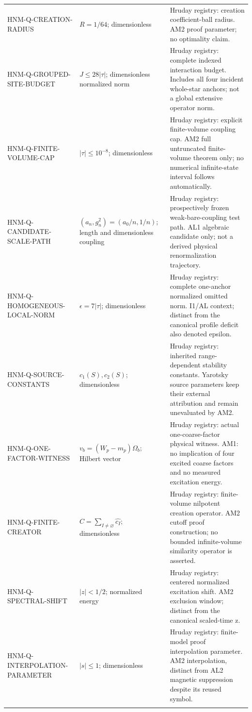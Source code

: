 \begin{longtable}{@{}p{37mm}p{40mm}p{72mm}@{}}
HNM-Q-CREATION-RADIUS & $R=1/64$; dimensionless & Hruday registry: creation coefficient-ball radius. AM2 proof parameter; no optimality claim.\\\addlinespace
HNM-Q-GROUPED-SITE-BUDGET & $J\le28|\tau|$; dimensionless normalized norm & Hruday registry: complete indexed interaction budget. Includes all four incident whole-star anchors; not a global extensive operator norm.\\\addlinespace
HNM-Q-FINITE-VOLUME-CAP & $|\tau|\le10^{-8}$; dimensionless & Hruday registry: explicit finite-volume coupling cap. AM2 full untruncated finite-volume theorem only; no numerical infinite-state interval follows automatically.\\\addlinespace
HNM-Q-CANDIDATE-SCALE-PATH & $(a_n,g_n^2)=(a_0/n,1/n)$; length and dimensionless coupling & Hruday registry: prospectively frozen weak-bare-coupling test path. AL1 algebraic candidate only; not a derived physical renormalization trajectory.\\\addlinespace
HNM-Q-HOMOGENEOUS-LOCAL-NORM & $\epsilon=7|\tau|$; dimensionless & Hruday registry: complete one-anchor normalized omitted norm. I1/AL context; distinct from the canonical profile deficit also denoted epsilon.\\\addlinespace
HNM-Q-SOURCE-CONSTANTS & $c_1(S),c_2(S)$; dimensionless & Hruday registry: inherited range-dependent stability constants. Yarotsky source parameters keep their external attribution and remain unevaluated by AM2.\\\addlinespace
HNM-Q-ONE-FACTOR-WITNESS & $v_b=(W_p-m_p)\Omega_b$; Hilbert vector & Hruday registry: actual one-coarse-factor physical witness. AM1: no implication of four excited coarse factors and no measured excitation energy.\\\addlinespace
HNM-Q-FINITE-CREATOR & $C=\sum_{I\ne\varnothing}\widehat{c_I}$; dimensionless & Hruday registry: finite-volume nilpotent creation operator. AM2 cutoff proof construction; no bounded infinite-volume similarity operator is asserted.\\\addlinespace
HNM-Q-SPECTRAL-SHIFT & $|z|<1/2$; normalized energy & Hruday registry: centered normalized excitation shift. AM2 exclusion window; distinct from the canonical scaled-time z.\\\addlinespace
HNM-Q-INTERPOLATION-PARAMETER & $|s|\le1$; dimensionless & Hruday registry: finite-model proof interpolation parameter. AM2 interpolation, distinct from AL2 magnetic suppression despite its reused symbol.\\\addlinespace

\end{longtable}
